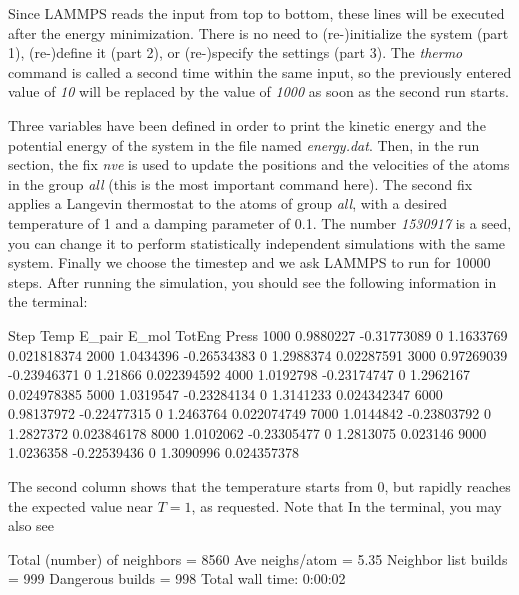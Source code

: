 \noindent Since LAMMPS reads the input from top to
bottom, these lines will be executed after the energy
minimization. There is no need to (re-)initialize the system
(part 1), (re-)define it (part 2), or (re-)specify the settings
(part 3). The \textit{thermo} command is called a second time within the 
same input, so the previously entered value of \textit{10} will be replaced
by the value of \textit{1000} as soon as the second run starts.

Three variables have been defined in order
to print the kinetic energy and the potential energy 
of the system in the file named \textit{energy.dat}. Then,
in the run section, the fix \textit{nve} is used to update the
positions and the velocities of the atoms in the group
\textit{all} (this is the most important command here). The second
fix applies a Langevin thermostat to the atoms of group
\textit{all}, with a desired temperature of 1 and a damping
parameter of 0.1. The number \textit{1530917} is a seed, you can
change it to perform statistically independent simulations
with the same system. Finally we choose the timestep
and we ask LAMMPS to run for 10000 steps. After running
the simulation, you should see the following information in
the terminal:

\begin{lcverbatim}
Step         Temp       E_pair    E_mol       TotEng        Press
1000    0.9880227  -0.31773089        0    1.1633769  0.021818374 
2000    1.0434396  -0.26534383        0    1.2988374   0.02287591 
3000   0.97269039  -0.23946371        0      1.21866  0.022394592 
4000    1.0192798  -0.23174747        0    1.2962167  0.024978385 
5000    1.0319547  -0.23284134        0    1.3141233  0.024342347 
6000   0.98137972  -0.22477315        0    1.2463764  0.022074749 
7000    1.0144842  -0.23803792        0    1.2827372  0.023846178 
8000    1.0102062  -0.23305477        0    1.2813075     0.023146 
9000    1.0236358  -0.22539436        0    1.3090996  0.024357378 
\end{lcverbatim}

\noindent The second column shows that the temperature
starts from 0, but rapidly reaches the
expected value near $T=1$, as requested. 
Note that  In the terminal, you may also see

\begin{lcverbatim}
Total (number) of neighbors = 8560
Ave neighs/atom = 5.35
Neighbor list builds = 999
Dangerous builds = 998
Total wall time: 0:00:02
\end{lcverbatim}

